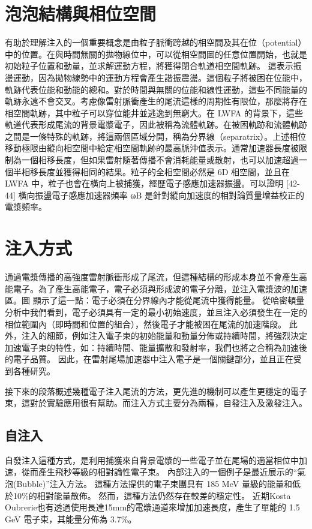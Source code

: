 \section{泡泡結構與相位空間}%
有助於理解注入的一個重要概念是由粒子脈衝跨越的相空間及其在位（potential）中的位置。在與時間無關的拋物線位中，可以從相空間圖的任意位置開始，也就是初始粒子位置和動量，並求解運動方程，將獲得閉合軌道相空間軌跡。
這表示振盪運動，因為拋物線勢中的運動方程會產生諧振震盪。這個粒子將被困在位能中，軌跡代表位能和動能的總和。對於時間與無關的位能和線性運動，這些不同能量的軌跡永遠不會交叉。考慮像雷射脈衝產生的尾流這樣的周期性有限位，那麼將存在相空間軌跡，其中粒子可以穿位能井並逃逸到無窮大。在 LWFA 的背景下，這些軌道代表形成尾流的背景電漿電子，因此被稱為流體軌跡。在被困軌跡和流體軌跡之間是一條特殊的軌跡，將這兩個區域分開，稱為分界線（separatrix）。上述相位移動極限由縱向相空間中給定相空間軌跡的最高脈沖值表示。通常加速器長度被限制為一個相移長度，但如果雷射隨著傳播不會消耗能量或散射，也可以加速超過一個半相移長度並獲得相同的結果。粒子的全相空間必然是 6D 相空間，並且在 LWFA 中，粒子也會在橫向上被捕獲，經歷電子感應加速器振盪。可以證明 [42-44] 橫向振盪電子感應加速器頻率 ωB 是針對縱向加速度的相對論質量增益校正的電漿頻率。
\section{注入方式}
通過電漿傳播的高強度雷射脈衝形成了尾流，但這種結構的形成本身並不會產生高能電子。為了產生高能電子，電子必須與形成波的電子分離，並注入電漿波的加速區。圖 顯示了這一點：電子必須在分界線內才能從尾流中獲得能量。 從哈密頓量分析中我們看到，電子必須具有一定的最小初始速度，並且注入必須發生在一定的相位範圍內（即時間和位置的組合），然後電子才能被困在尾流的加速階段。 此外，注入的細節，例如注入電子束的初始能量和動量分佈或持續時間，將強烈決定加速電子束的特性，如：持續時間、能量擴散和發射率，我們也將之合稱為加速後的電子品質。 因此，在雷射尾場加速器中注入電子是一個關鍵部分，並且正在受到各種研究。


接下來的段落概述幾種電子注入尾流的方法，更先進的機制可以產生更穩定的電子束，這對於實驗應用很有幫助。而注入方式主要分為兩種，自發注入及激發注入。

\subsection{自注入}
自發注入這種方式，是利用捕獲來自背景電漿的一些電子並在尾場的適當相位中加速，從而產生飛秒等級的相對論性電子束。 內部注入的一個例子是最近展示的“氣泡(Bubble)”注入方法\cite{Wang_2018}。 這種方法提供的電子束團具有 185 MeV 量級的能量和低於10\%的相對能量散佈。 然而，這種方法仍然存在較差的穩定性。
近期Kosta Oubrerie也有透過使用長達15mm的電漿通道來增加加速長度，產生了單能的 1.5 GeV 電子束，其能量分佈為 3.7\%。\cite{cite-key}
